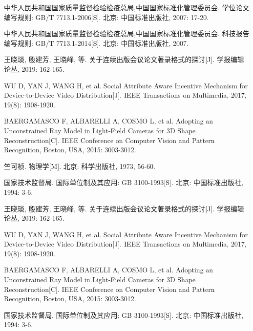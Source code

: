 



\begin{thebibliography}{200}
\wuhao %
\linespread{1}\selectfont
\setlength{\itemsep}{-1.4ex} %
\thispagestyle{others}
\pagestyle{others}

\makeatletter
\renewcommand\@biblabel[1]{[#1]\hfill} %
\makeatother
\setlength{\labelsep}{0cm}


中华人民共和国国家质量监督检验检疫总局,中国国家标准化管理委员会. 学位论文编写规则: GB/T 7713.1-2006[S]. 北京: 中国标准出版社, 2007: 17-20.


中华人民共和国国家质量监督检验检疫总局,中国国家标准化管理委员会. 科技报告编写规则: GB/T 7713.1-2014[S]. 北京: 中国标准出版社, 2007.

王晓琰, 殷建芳, 王晓峰, 等. 关于连续出版会议论文著录格式的探讨[J]. 学报编辑论丛, 2019: 162-165.

WU D, YAN J, WANG H, et al. Social Attribute Aware Incentive Mechanism for Device-to-Device Video Distribution[J]. IEEE Transactions on Multimedia, 2017, 19(8): 1908-1920.

BAERGAMASCO F, ALBARELLI A, COSMO L, et al. Adopting an Unconstrained Ray Model in Light-Field Cameras for 3D Shape Reconstruction[C]. IEEE Conference on Computer Vision and Pattern Recognition, Boston, USA, 2015: 3003-3012.

竺可桢. 物理学[M]. 北京: 科学出版社, 1973, 56-60.

国家技术监督局. 国际单位制及其应用: GB 3100-1993[S]. 北京: 中国标准出版社, 1994: 3-6.

王晓琰, 殷建芳, 王晓峰, 等. 关于连续出版会议论文著录格式的探讨[J]. 学报编辑论丛, 2019: 162-165.

WU D, YAN J, WANG H, et al. Social Attribute Aware Incentive Mechanism for Device-to-Device Video Distribution[J]. IEEE Transactions on Multimedia, 2017, 19(8): 1908-1920.

BAERGAMASCO F, ALBARELLI A, COSMO L, et al. Adopting an Unconstrained Ray Model in Light-Field Cameras for 3D Shape Reconstruction[C]. IEEE Conference on Computer Vision and Pattern Recognition, Boston, USA, 2015: 3003-3012.

国家技术监督局. 国际单位制及其应用: GB 3100-1993[S]. 北京: 中国标准出版社, 1994: 3-6.


\end{thebibliography}
